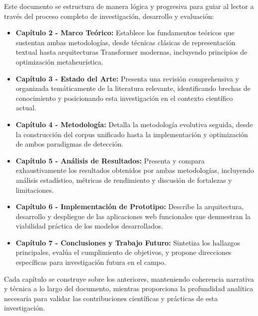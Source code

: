Este documento se estructura de manera lógica y progresiva para guiar al lector a través del proceso completo de investigación, desarrollo y evaluación:

\begin{itemize}
    \item \textbf{Capítulo 2 - Marco Teórico:} Establece los fundamentos teóricos que sustentan ambas metodologías, desde técnicas clásicas de representación textual hasta arquitecturas Transformer modernas, incluyendo principios de optimización metaheurística.

    \item \textbf{Capítulo 3 - Estado del Arte:} Presenta una revisión comprehensiva y organizada temáticamente de la literatura relevante, identificando brechas de conocimiento y posicionando esta investigación en el contexto científico actual.

    \item \textbf{Capítulo 4 - Metodología:} Detalla la metodología evolutiva seguida, desde la construcción del corpus unificado hasta la implementación y optimización de ambos paradigmas de detección.

    \item \textbf{Capítulo 5 - Análisis de Resultados:} Presenta y compara exhaustivamente los resultados obtenidos por ambas metodologías, incluyendo análisis estadístico, métricas de rendimiento y discusión de fortalezas y limitaciones.

    \item \textbf{Capítulo 6 - Implementación de Prototipo:} Describe la arquitectura, desarrollo y despliegue de las aplicaciones web funcionales que demuestran la viabilidad práctica de los modelos desarrollados.

    \item \textbf{Capítulo 7 - Conclusiones y Trabajo Futuro:} Sintetiza los hallazgos principales, evalúa el cumplimiento de objetivos, y propone direcciones específicas para investigación futura en el campo.
\end{itemize}

Cada capítulo se construye sobre los anteriores, manteniendo coherencia narrativa y técnica a lo largo del documento, mientras proporciona la profundidad analítica necesaria para validar las contribuciones científicas y prácticas de esta investigación.